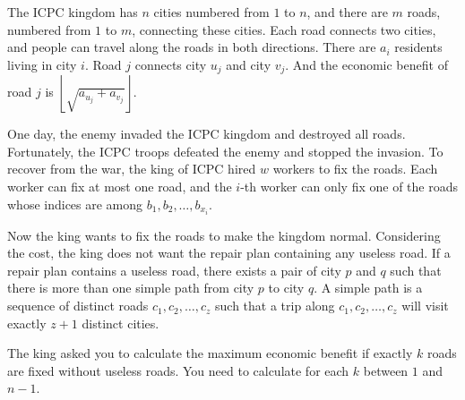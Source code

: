 The ICPC kingdom has $n$ cities numbered from $1$ to $n$, 
and there are $m$ roads, numbered from $1$ to $m$,  connecting these cities. 
Each road connects two cities, and people can travel along the roads in both directions.
There are $a_i$ residents living in city $i$.
Road $j$ connects city $u_j$ and city $v_j$. 
And the economic benefit of road $j$ is $\left\lfloor\sqrt{a_{u_j}+a_{v_j}}\right\rfloor$.

One day, the enemy invaded the ICPC kingdom and destroyed all roads.
Fortunately, the ICPC troops defeated the enemy and stopped the invasion.
To recover from the war, the king of ICPC hired $w$ workers to fix the roads.
Each worker can fix at most one road, and
the $i$-th worker can only fix one of the roads whose indices are among $b_1,b_2,\dots,b_{x_i}$.

Now the king wants to fix the roads to make the kingdom normal.
Considering the cost, the king does not want the repair plan containing any useless road.
If a repair plan contains a useless road, there exists a pair of city $p$ and $q$
such that there is more than one simple path from city $p$ to city $q$.
A simple path is a sequence of distinct roads $c_1,c_2,\dots,c_z$ such that 
a trip along $c_1,c_2,\dots,c_z$ will visit exactly $z+1$ distinct cities. 

The king asked you to calculate the maximum economic benefit if exactly $k$ roads are fixed without useless roads.
You need to calculate for each $k$ between $1$ and $n-1$.

